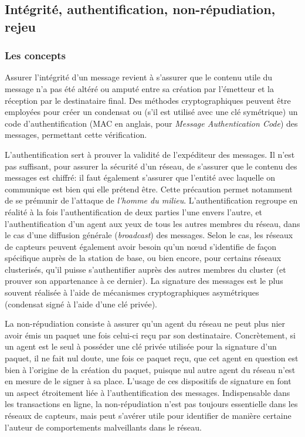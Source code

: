 \subsection{Intégrité, authentification, non-répudiation, rejeu}

    \subsubsection{Les concepts}
Assurer l'intégrité d'un message revient à s'assurer que le contenu utile du message n'a pas été altéré ou amputé entre sa création par l'émetteur et la réception par le destinataire final.
Des méthodes cryptographiques peuvent être employées pour créer un condensat ou (s'il est utilisé avec une clé symétrique) un code d'authentification (MAC en anglais, pour \textit{Message Authentication Code}) des messages, permettant cette vérification.

L'authentification sert à prouver la validité de l'expéditeur des messages.
Il n'est pas suffisant, pour assurer la sécurité d'un réseau, de s'assurer que le contenu des messages est chiffré: il faut également s'assurer que l'entité avec laquelle on communique est bien qui elle prétend être.
Cette précaution permet notamment de se prémunir de l'attaque de \textit{l'homme du milieu}.
L'authentification regroupe en réalité à la fois l'authentification de deux parties l'une envers l'autre, et l'authentification d'un agent aux yeux de tous les autres membres du réseau, dans le cas d'une diffusion générale (\textit{broadcast}) des messages.
Selon le cas, les réseaux de capteurs peuvent également avoir besoin qu'un nœud s'identifie de façon spécifique auprès de la station de base, ou bien encore, pour certains réseaux clusterisés, qu'il puisse s'authentifier auprès des autres membres du cluster (et prouver son appartenance à ce dernier).
La signature des messages est le plus souvent réalisée à l'aide de mécanismes cryptographiques asymétriques (condensat signé à l'aide d'une clé privée).

La non-répudiation consiste à assurer qu'un agent du réseau ne peut plus nier avoir émis un paquet une fois celui-ci reçu par son destinataire.
Concrètement, si un agent est le seul à posséder une clé privée utilisée pour la signature d'un paquet, il ne fait nul doute, une fois ce paquet reçu, que cet agent en question est bien à l'origine de la création du paquet, puisque nul autre agent du réseau n'est en mesure de le signer à sa place.
L'usage de ces dispositifs de signature en font un aspect étroitement liée à l'authentification des messages.
Indispensable dans les transactions en ligne, la non-répudiation n'est pas toujours essentielle dans les réseaux de capteurs, mais peut s'avérer utile pour identifier de manière certaine l'auteur de comportements malveillants dans le réseau.

